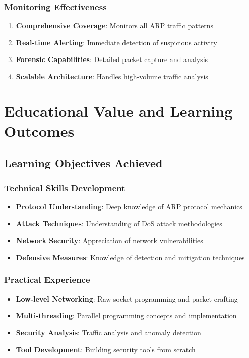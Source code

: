 \documentclass[12pt,a4paper]{article}
\begin{document}
\subsubsection{Monitoring Effectiveness}
\begin{enumerate}
    \item \textbf{Comprehensive Coverage}: Monitors all ARP traffic patterns
    \item \textbf{Real-time Alerting}: Immediate detection of suspicious activity
    \item \textbf{Forensic Capabilities}: Detailed packet capture and analysis
    \item \textbf{Scalable Architecture}: Handles high-volume traffic analysis
\end{enumerate}

\section{Educational Value and Learning Outcomes}

\subsection{Learning Objectives Achieved}

\subsubsection{Technical Skills Development}
\begin{itemize}
    \item \textbf{Protocol Understanding}: Deep knowledge of ARP protocol mechanics
    \item \textbf{Attack Techniques}: Understanding of DoS attack methodologies
    \item \textbf{Network Security}: Appreciation of network vulnerabilities
    \item \textbf{Defensive Measures}: Knowledge of detection and mitigation techniques
\end{itemize}

\subsubsection{Practical Experience}
\begin{itemize}
    \item \textbf{Low-level Networking}: Raw socket programming and packet crafting
    \item \textbf{Multi-threading}: Parallel programming concepts and implementation
    \item \textbf{Security Analysis}: Traffic analysis and anomaly detection
    \item \textbf{Tool Development}: Building security tools from scratch
\end{itemize}
\end{document}
